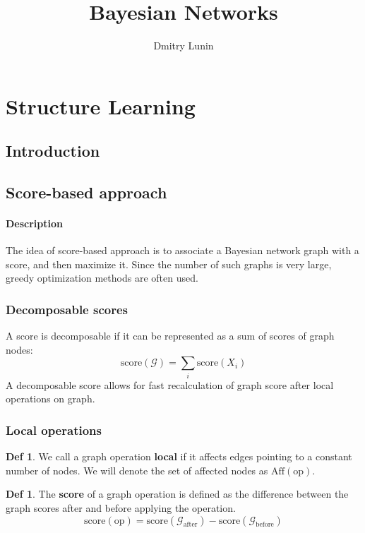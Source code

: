 \documentclass{article}
\author{Dmitry Lunin}
\title{Bayesian Networks}
\newcommand{\score}[1]{
	\textrm{score}(#1)
}
\newcommand{\affnodes}[1]{
	\textrm{Aff}(#1)	
}
\newcommand{\graph}[1]{
	\mathcal{#1}
}
\begin{document}
\maketitle
	
\section{Structure Learning}
\subsection{Introduction}

\subsection{Score-based approach}
\paragraph{Description} The idea of score-based approach is to associate a Bayesian network graph with a score, and then maximize it. Since the number of such graphs is very large, greedy optimization methods are often used.
\subsubsection{Decomposable scores}
A score is decomposable if it can be represented as a sum of scores of graph nodes: $$ \score{\graph{G}} = \sum_i{\score{X_i}} $$
A decomposable score allows for fast recalculation of graph score after local operations on graph. 
\subsubsection{Local operations}

\theoremstyle{definition}
\newtheorem*{local.operation}{Def}
\begin{local.operation}
	We call a graph operation \textbf{local} if it affects edges pointing to a constant number of nodes. We will denote the set of affected nodes as $\affnodes{\textrm{op}}$.
\end{local.operation}

\theoremstyle{definition}
\newtheorem*{operation.score}{Def}
\begin{operation.score}
	The \textbf{score} of a graph operation is defined as the difference between the graph scores after and before applying the operation.
	$$ \score{\textrm{op}} = \score{\graph{G}_{\textrm{after}}} - \score{\graph{G}_{\textrm{before}}} $$
\end{operation.score}
\end{document}

